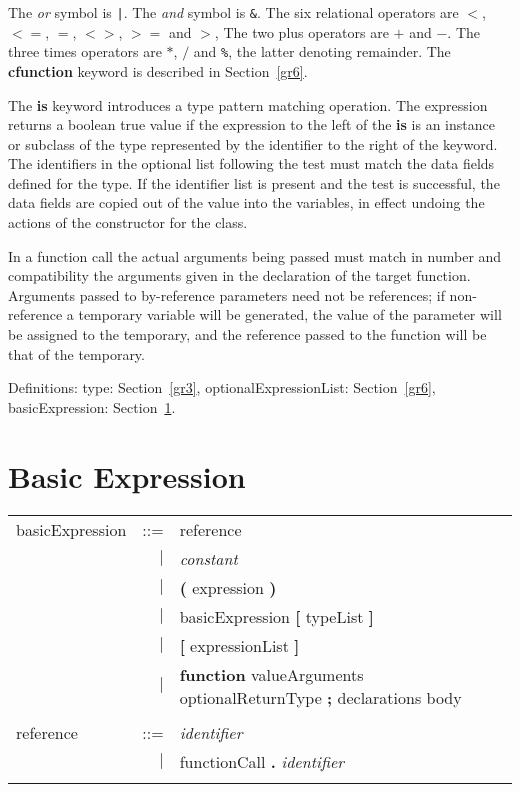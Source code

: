The {\em or} symbol is \verb+|+.
The {\em and} symbol is \verb+&+.
The six relational operators are $<$, $<=$, $=$, $<>$, $>=$ and $>$,
The two plus operators are $+$ and $-$.
The three times operators are $*$, $/$ and \verb+%+, the latter denoting
remainder.
The {\bf cfunction} keyword is described in Section~\ref{gr6}.

The {\bf is} keyword introduces a type pattern matching operation.
The expression returns a boolean true value if the expression to the
left of the {\bf is} is an instance or subclass of the type represented
by the identifier to the right of the keyword.  The identifiers in
the optional list following the test must match the data fields
defined for the type.  If the identifier list is present and the test
is successful, the data fields are copied out of the value into the
variables, in effect undoing the actions of the constructor for the class.

In a function call the actual arguments being passed must match in number and
compatibility the arguments given in the declaration of the target function.
Arguments passed to by-reference parameters need not be references; if
non-reference a temporary variable will be generated, the value of
the parameter will be assigned to the temporary, and the reference passed
to the function will be that of the temporary.

Definitions:
type: Section~\ref{gr3},
optionalExpressionList: Section~\ref{gr6},
basicExpression: Section~\ref{gr8}.

\section{Basic Expression}\label{gr8}

\begin{tabular}{l r l}
basicExpression & ::= & reference \\
& $\mid$ & {\em constant} \\
& $\mid$ & {\bf (} expression {\bf )} \\
& $\mid$ & basicExpression {\bf [} typeList {\bf ]} \\
& $\mid$ & {\bf [} expressionList {\bf ]} \\
& $\mid$ & {\bf function} valueArguments optionalReturnType {\bf ;} declarations body \\ \\
reference & ::= & {\em identifier} \\
& $\mid$ & functionCall {\bf .} {\em identifier} \\ \\
\end{tabular}

